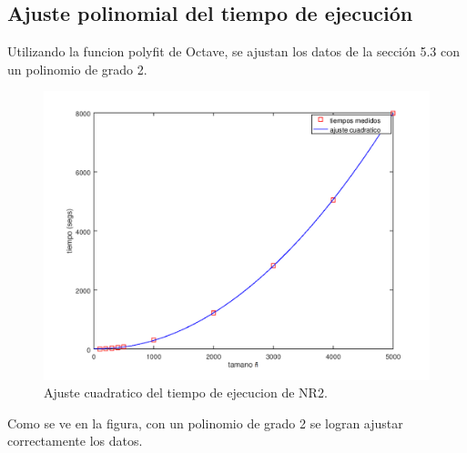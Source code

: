 \documentclass{endm}
\begin{document}
\subsection{Ajuste polinomial del tiempo de ejecución}
Utilizando la funcion polyfit de Octave, se ajustan los datos de la sección 5.3 con un polinomio de grado 2.
\begin{figure}[h!]
    \includegraphics[width=\linewidth]{Grafica_5_4.png}
    \caption{Ajuste cuadratico del tiempo de ejecucion de NR2.}
    \label{fig:Grafica_5_4}
\end{figure}
Como se ve en la figura, con un polinomio de grado 2 se logran ajustar correctamente los datos.


\clearpage
\end{document}
